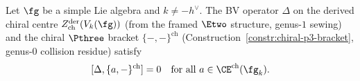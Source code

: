 \begin{lemma}
\label{lem:bv-p3-commutativity}
Let $\fg$ be a simple Lie algebra and $k \neq -h^\vee$.
The BV operator $\Delta$ on the derived chiral centre
$Z^{\mathrm{der}}_{\mathrm{ch}}(V_k(\fg))$
\textup{(}from the framed $\Etwo$ structure,
genus-$1$ sewing\textup{)} and the chiral $\Pthree$
bracket $\{-,-\}^{\mathrm{ch}}$
\textup{(}Construction~\textup{\ref{constr:chiral-p3-bracket}},
genus-$0$ collision residue\textup{)} satisfy
\begin{equation}\label{eq:bv-p3-commute}
  [\Delta, \{a,-\}^{\mathrm{ch}}] = 0
  \quad \text{for all } a \in \CE^{\mathrm{ch}}(\fg_k).
\end{equation}
\end{lemma}

